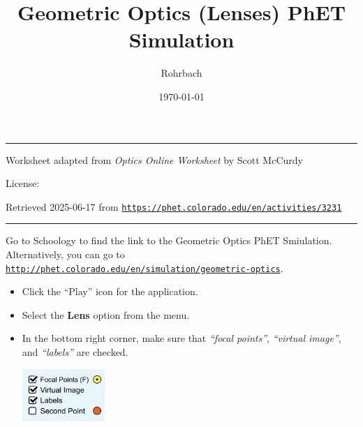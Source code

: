 \documentclass[10pt]{exam}
\title{Geometric Optics (Lenses) PhET Simulation}
\author{Rohrbach}
\date{\today}
\begin{document}
\maketitle

\hrule
\vspace{0.2em}
\noindent
{\footnotesize Worksheet adapted from \emph{Optics Online Worksheet} by Scott McCurdy }

{\footnotesize License:} \cc\hspace{-1em}

{\footnotesize Retrieved 2025-06-17 from \texttt{\href{https://phet.colorado.edu/en/activities/3231}{https://phet.colorado.edu/en/activities/3231}} }
\vspace{0.2em}
\hrule

\vspace{2em}

\noindent
Go to Schoology to find the link to the Geometric Optics PhET Smiulation.  Alternatively, you can go to \href{http://phet.colorado.edu/en/simulation/geometric-optics}{\texttt{http://phet.colorado.edu/en/simulation/geometric-optics}}.

\begin{itemize}
    \item Click the ``Play'' icon for the application.
    \item Select the \textbf{Lens} option from the menu.
    \item In the bottom right corner, make sure that \emph{``focal points''}, \emph{``virtual image''}, and \emph{``labels''} are checked.
    
    \hfill  \includegraphics[height=2cm]{checkboxes.png}

\end{itemize}
\end{document}
